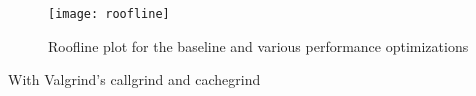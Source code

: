 \begin{figure}
  \texttt{[image: roofline]}
  \caption{Roofline plot for the baseline and various performance optimizations}
  \label{fig:roofline}
\end{figure}


 With Valgrind's callgrind and cachegrind




